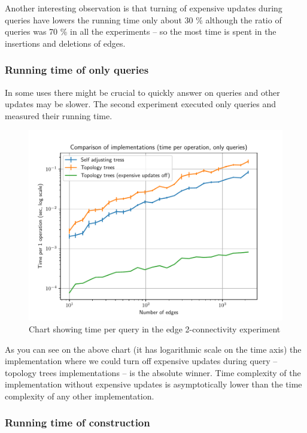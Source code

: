 Another interesting observation is that turning of expensive updates during
queries have lowers the running time only about 30 \% although the ratio of
queries was 70 \% in all the experiments -- so the most time is spent in the
insertions and deletions of edges.

\subsubsection{Running time of only queries}

In some uses there might be crucial to quickly answer on queries and other
updates may be slower. The second experiment executed only queries and measured
their running time.

\begin{figure}[H]
\centering
{}\hsize
\includegraphics[width=\hsize]{charts/double_edge_connectivity_op_queries.pdf}
\caption{Chart showing time per query in the edge 2-connectivity experiment}
\end{figure}

As you can see on the above chart (it has logarithmic scale on the time axis)
the implementation where we could turn off expensive updates during query --
topology trees implementations -- is the absolute winner. Time complexity of
the implementation without expensive updates is asymptotically lower than the
time complexity of any other implementation.

\subsubsection{Running time of construction}


